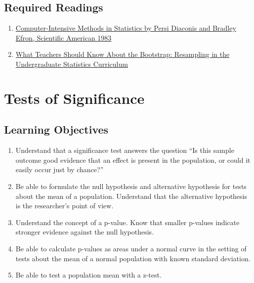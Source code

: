 \documentclass[letterpaper,10pt,twocolumn,twoside,]{pinp}
\providecommand{\tightlist}{%
  \setlength{\itemsep}{0pt}\setlength{\parskip}{0pt}}
\begin{document}
\hypertarget{required-readings}{%
\subsection{Required Readings}\label{required-readings}}

\begin{enumerate}
\item \href{https://www.dropbox.com/s/cxiq70zxxtyxlb5/EfronDiaconisBootstrap.pdf?dl=0}{Computer-Intensive Methods in Statistics by Persi Diaconis and Bradley Efron, Scientific American 1983}
\item \href{https://amstat.tandfonline.com/doi/full/10.1080/00031305.2015.1089789}{What Teachers Should Know About the Bootstrap: Resampling in the Undergraduate Statistics Curriculum}
\end{enumerate}

\vspace*{0.25cm}

\hypertarget{tests-of-significance}{%
\section{Tests of Significance}\label{tests-of-significance}}

\hypertarget{learning-objectives-1}{%
\subsection{Learning Objectives}\label{learning-objectives-1}}

\begin{enumerate}
\def\labelenumi{\arabic{enumi}.}
\tightlist
\item
  Understand that a significance test answers the question ``Is this
  sample outcome good evidence that an effect is present in the
  population, or could it easily occur just by chance?''
\item
  Be able to formulate the null hypothesis and alternative hypothesis
  for tests about the mean of a population. Understand that the
  alternative hypothesis is the researcher's point of view.
\item
  Understand the concept of a p-value. Know that smaller p-values
  indicate stronger evidence against the null hypothesis.
\item
  Be able to calculate p-values as areas under a normal curve in the
  setting of tests about the mean of a normal population with known
  standard deviation.
\item
  Be able to test a population mean with a z-test.
\end{enumerate}
\end{document}
